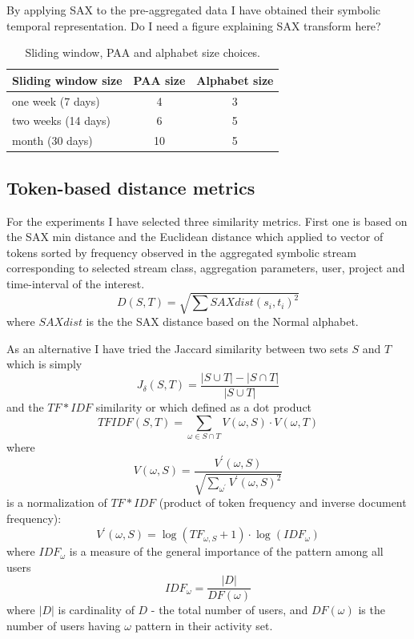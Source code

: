 \documentclass[10pt, conference, compsocconf]{IEEEtran}
\begin{document}
By applying SAX to the pre-aggregated data I have obtained their symbolic temporal 
representation. Do I need a figure explaining SAX transform here?

\begin{table}
  \caption{Sliding window, PAA and alphabet size choices.}
  \centering
  \label{tab:parameters}
  \begin{tabular}{ | l | c | c |}
  \hline                       
  Sliding window size & PAA size & Alphabet size \\
  \hline 
    one week (7 days) & 4 & 3 \\  
    two weeks (14 days) & 6 & 5 \\ 
    month (30 days) & 10 & 5 \\ 
  \hline  
  \end{tabular}
\end{table}

\subsection{Token-based distance metrics}
For the experiments I have selected three similarity metrics. 
First one is based on the SAX min distance and the Euclidean distance which applied to vector of tokens 
sorted by frequency observed in the aggregated symbolic stream corresponding to selected stream class,
aggregation parameters, user, project and time-interval of the interest. 
\begin{equation}
D(S,T) = \sqrt{ \sum SAXdist(s_{i},t_{i})^{2} }
\end{equation} 
where $SAXdist$ is the the SAX distance based on the Normal alphabet.

As an alternative I have tried the Jaccard similarity between two sets $S$ and $T$ which is simply 
\begin{equation}
J_{\delta}(S,T) = \frac{|S\cup T| - |S\cap T|}{|S\cup T|}
\end{equation} 
and the $TF\ast IDF$ similarity or which defined as a dot product 
\begin{equation}
 TFIDF(S,T) = \sum_{\omega \in S \cap T} V(\omega, S) \cdot V(\omega, T)
\end{equation} 
where 
\begin{equation}
 V(\omega, S) = \frac { V^{\prime} (\omega,S) } { \sqrt{ \sum_{\omega^{\prime}} V^{\prime} (\omega,S)^{2}} }
\end{equation} 
is a normalization of $TF\ast IDF$ (product of token frequency and inverse document frequency):
\begin{equation}
 V^{\prime} (\omega,S) = \log(TF_{\omega, S} +1) \cdot \log(IDF_{\omega})
\end{equation} 
where $IDF_{\omega}$ is a measure of the general importance of the pattern among all users
\begin{equation}
 IDF_{\omega} = \frac{|D|}{DF(\omega)}
\end{equation} 
where $|D|$ is cardinality of $D$ - the total number of users, and $DF(\omega)$ is the number of users having $\omega$ pattern in their activity set.
\end{document}
